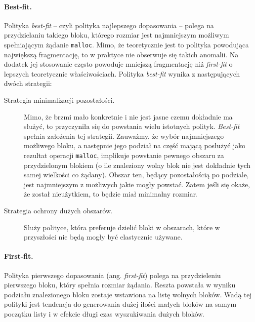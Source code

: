 \documentclass[12pt,a4paper,titlepage,twoside]{mwart}
\begin{document}
\paragraph{Best-fit.}

Polityka \textit{best-fit} -- czyli polityka najlepszego dopasowania -- polega
na przydzielaniu takiego bloku, którego rozmiar jest najmniejszym możliwym
spełniającym żądanie \texttt{malloc}. Mimo, że teoretycznie jest to polityka
powodująca największą fragmentację, to w praktyce nie obserwuje się takich
anomalii. Na dodatek jej stosowanie często powoduje mniejszą fragmentację niż
\textit{first-fit} o lepszych teoretycznie właściwościach. Polityka
\textit{best-fit} wynika z następujących dwóch strategii:
\vspace{-1ex}

\begin{description}
\item[Strategia minimalizacji pozostałości.] Mimo, że brzmi mało konkretnie i
nie jest jasne czemu dokładnie ma służyć, to przyczyniła się do powstania wielu
istotnych polityk. \textit{Best-fit} spełnia założenia tej strategii. Zauważmy,
że wybór najmniejszego możliwego bloku, a następnie jego podział na część
mającą posłużyć jako rezultat operacji \texttt{malloc}, implikuje powstanie
pewnego obszaru za przydzielonym blokiem (o ile znaleziony wolny blok nie jest
dokładnie tych samej wielkości co żądany). Obszar ten, będący pozostałością po
podziale, jest najmniejszym z możliwych jakie mogły powstać. Zatem jeśli się
okaże, że został nieużytkiem, to będzie miał minimalny rozmiar.
\vspace{1ex}

\item[Strategia ochrony dużych obszarów.] Służy polityce, która preferuje
dzielić bloki w obszarach, które w przyszłości nie będą mogły być elastycznie
używane.
\end{description}

\paragraph{First-fit.}

Polityka pierwszego dopasowania (ang. \textit{first-fit}) polega na
przydzieleniu pierwszego bloku, który spełnia rozmiar żądania. Reszta powstała
w wyniku podziału znalezionego bloku zostaje wstawiona na listę wolnych bloków.
Wadą tej polityki jest tendencja do generowania dużej ilości małych bloków na
samym początku listy i w efekcie długi czas wyszukiwania dużych bloków.
\end{document}
